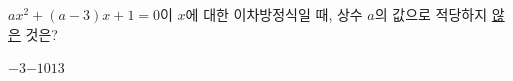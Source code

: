 $ax^2+(a-3)x+1=0$이 $x$에 대한 이차방정식일 때, 상수 $a$의 값으로 적당하지 \underline{않은} 것은?
\begin{choices32}{$-3$}{$-1$}{$0$}{$1$}{$3$}\end{choices32}
